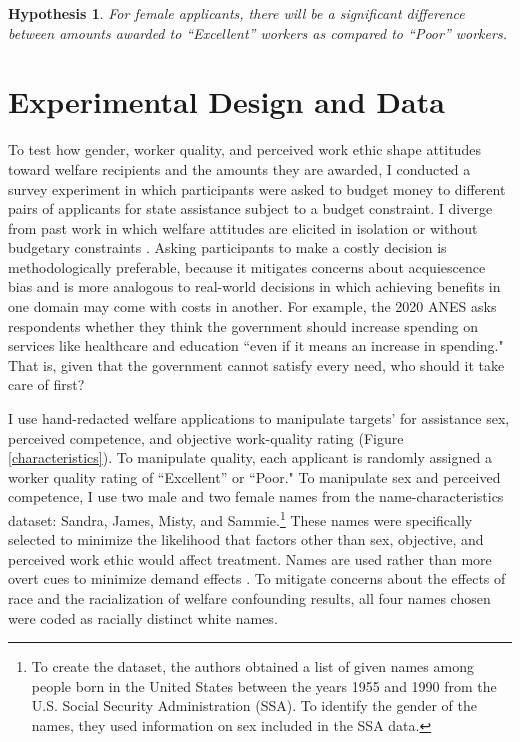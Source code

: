 \documentclass[12pt]{article}%
\newtheorem{hypothesis}{Hypothesis}
\begin{document}
\begin{doublespace}
\begin{hypothesis} \label{hyp:thirdb}
	For female applicants, there will be a significant difference between amounts awarded to ``Excellent” workers as compared to ``Poor” workers.
\end{hypothesis}


\section*{Experimental Design and Data}
To test how gender, worker quality, and perceived work ethic shape attitudes toward welfare recipients and the amounts they are awarded, I conducted a survey experiment in which participants were asked to budget money to different pairs of applicants for state assistance subject to a budget constraint. I diverge from past work in which welfare attitudes are elicited in isolation or without budgetary constraints \citep{rabinowitz2009white, aaroe2014crowding, sniderman1993scar, monnat2010color}. Asking participants to make a costly decision is methodologically preferable, because it mitigates concerns about acquiescence bias and is more analogous to real-world decisions in which achieving benefits in one domain may come with costs in another. For example, the 2020 ANES asks respondents whether they think the government should increase spending on services like healthcare and education ``even if it means an increase in spending." That is, given that the government cannot satisfy every need, who should it take care of first?

I use hand-redacted welfare applications to manipulate targets’ for assistance sex, perceived competence, and objective work-quality rating (Figure \ref{characteristics}). To manipulate quality, each applicant is randomly assigned a worker quality rating of ``Excellent” or ``Poor." To manipulate sex and perceived competence, I use two male and two female names from the \cite{hayes_2020} name-characteristics dataset: Sandra, James, Misty, and Sammie.\footnote{To create the dataset, the authors obtained a list of given names among people born in the United States between the years 1955 and 1990 from the U.S. Social Security Administration (SSA). To identify the gender of the names, they used information on sex included in the SSA data.} These names were specifically selected to minimize the likelihood that factors other than sex, objective, and perceived work ethic would affect treatment. Names are used rather than more overt cues to minimize demand effects \citep{quidt_experimenter_2019, mummolo2019demand}. To mitigate concerns about the effects of race and the racialization of welfare confounding results, all four names chosen were coded as racially distinct white names.


\end{doublespace}
\end{document}
